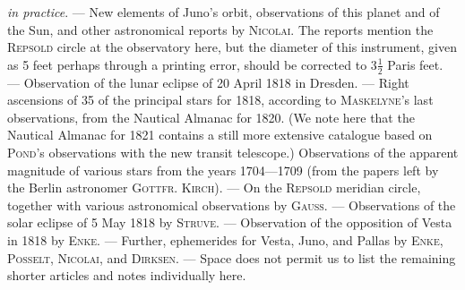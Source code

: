 \emph{in practice}. --- New elements of Juno's orbit, observations of this planet and of the Sun, and other astronomical reports by \textsc{Nicolai}. The reports mention the \textsc{Repsold} circle at the observatory here, but the diameter of this instrument, given as 5 feet perhaps through a printing error, should be corrected to $3\tfrac{1}{2}$ Paris feet. --- Observation of the lunar eclipse of 20 April 1818 in Dresden. --- Right ascensions of 35 of the principal stars for 1818, according to \textsc{Maskelyne}'s last observations, from the Nautical Almanac for 1820. (We note here that the Nautical Almanac for 1821 contains a still more extensive catalogue based on \textsc{Pond}'s observations with the new transit telescope.) Observations of the apparent magnitude of various stars from the years 1704---1709 (from the papers left by the Berlin astronomer \textsc{Gottfr. Kirch}). --- On the \textsc{Repsold} meridian circle, together with various astronomical observations by \textsc{Gauss}. --- Observations of the solar eclipse of 5 May 1818 by \textsc{Struve}. --- Observation of the opposition of Vesta in 1818 by \textsc{Enke}. --- Further, ephemerides for Vesta, Juno, and Pallas by \textsc{Enke}, \textsc{Posselt}, \textsc{Nicolai}, and \textsc{Dirksen}. --- Space does not permit us to list the remaining shorter articles and notes individually here.
\par\clearpage\endgroup
